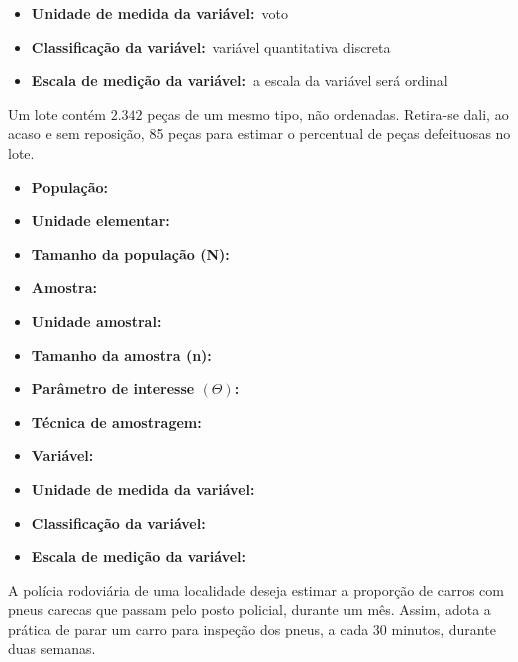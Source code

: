 \begin{enumerate}
\begin{itemize}
		\item \textbf{Unidade de medida da variável:}~voto
		
		\item \textbf{Classificação da variável:}~variável quantitativa discreta
		
		\item \textbf{Escala de medição da variável:}~a escala da variável será ordinal 
	\end{itemize}

	\subitem Um lote contém $2.342$ peças de um mesmo tipo, não ordenadas. Retira-se dali, ao
acaso e sem reposição, 85 peças para estimar o percentual de peças defeituosas no
lote.

	\begin{itemize}	
		\item \textbf{População:}~
		
		\item \textbf{Unidade elementar:}~
		
		\item \textbf{Tamanho da população (N):}~
		
		\item \textbf{Amostra:}~
		
		\item \textbf{Unidade amostral:}~
		
		\item \textbf{Tamanho da amostra (n):}~
		
		\item \textbf{Parâmetro de interesse $\left(\varTheta\right)$:}~
		
		\item \textbf{Técnica de amostragem:}~
		
		\item \textbf{Variável:}~
		
		\item \textbf{Unidade de medida da variável:}~
		
		\item \textbf{Classificação da variável:}~
		
		\item \textbf{Escala de medição da variável:}~
	\end{itemize}

	\subitem A polícia rodoviária de uma localidade deseja estimar a proporção de carros com pneus
carecas que passam pelo posto policial, durante um mês. Assim, adota a prática de
parar um carro para inspeção dos pneus, a cada 30 minutos, durante duas semanas.
	

\end{enumerate}
